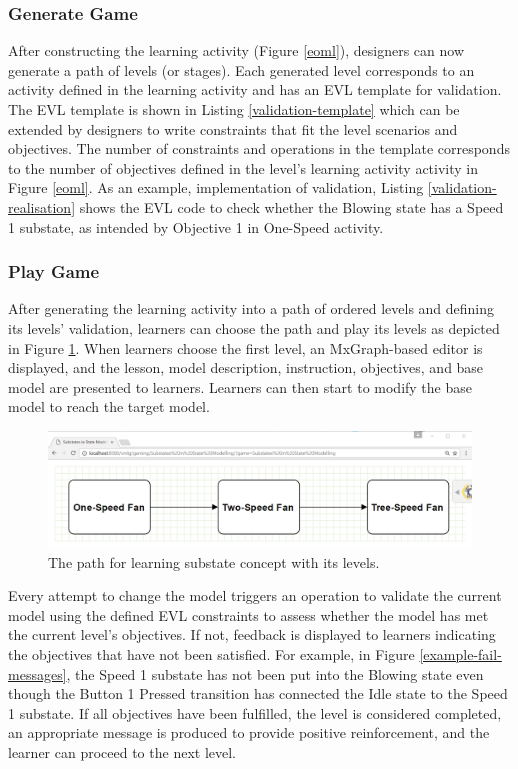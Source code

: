 \documentclass[12pt, a4paper]{report} \usepackage[titletoc]{appendix}
\begin{document}
\subsubsection{Generate Game}
After constructing the learning activity (Figure \ref{eoml}), designers can now generate a path of levels (or stages). Each generated level corresponds to an activity defined in the learning activity and has an EVL template for validation. The EVL template is shown in Listing \ref{validation-template} which can be extended by designers to write constraints that fit the level scenarios and objectives. The number of constraints and operations in the template corresponds to the number of objectives defined in the level's learning activity activity in Figure \ref{eoml}. As an example, implementation of validation, Listing \ref{validation-realisation} shows the EVL code to check whether the Blowing state has a Speed 1 substate, as intended by Objective 1 in One-Speed activity.   


\subsubsection{Play Game}
After generating the learning activity into a path of ordered levels and defining its levels' validation, learners can choose the path and play its levels as depicted in Figure \ref{path}. When learners choose the first level, an MxGraph-based editor is displayed, and the lesson, model description, instruction, objectives, and base model are presented to learners. Learners can then start to modify the base model to reach the target model. 

\begin{figure}[t!]
\centering
\includegraphics[width=12cm]{path}
\caption{The path for learning substate concept with its levels.}
\label{path}
\end{figure}    

Every attempt to change the model triggers an operation to validate the current model using the defined EVL constraints to assess whether the model has met the current level's objectives. If not, feedback is displayed to learners indicating the objectives that have not been satisfied. For example, in Figure \ref{example-fail-messages}, the Speed 1 substate has not been put into the Blowing state even though the Button 1 Pressed transition has connected the Idle state to the Speed 1 substate. If all objectives have been fulfilled, the level is considered completed, an appropriate message is produced to provide positive reinforcement, and the learner can proceed to the next level.  
\end{document}
